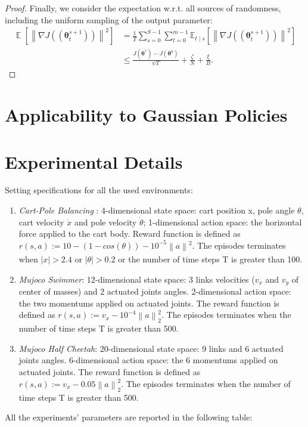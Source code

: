 \documentclass{article}
\makeatletter
\theoremstyle{remark}
\theoremstyle{definition}
\DeclareRobustCommand{\wrt}{w.r.t.\@\xspace}
\newcommand{\todomat}[1]{\todo[color=citrine, inline]{\small #1}}
\DeclareMathOperator*{\EV}{\mathbb{E}}
\newcommand{\EVV}[2][\ppvect \in \ppspace]{\EV_{#1}\left[{#2}\right]}
\newcommand{\norm}[2][\infty]{\left\|#2\right\|_{#1}}
\newcommand{\vtheta}{\boldsymbol{\theta}}
\newcommand{\gradJ}[1]{\nabla J(#1)}
\newcommand{\Ets}[2][t]{\mathbb{E}_{#1\mid s}\left[#2\right]}
\makeatother
\begin{document}
\begin{proof}
Finally, we consider the expectation \wrt all sources of randomness, including the uniform sampling of the output parameter:
\begin{align}
\EVV[]{\norm[]{\gradJ{(\vtheta_t^{s+1})}}^2} 
&=\frac{1}{T}\sum_{s=0}^{S-1}\sum_{t=0}^{m-1}\Ets{\norm[]{\gradJ{(\vtheta_t^{s+1})}}^2} \nonumber\\
&\leq
\frac{J(\vtheta^*) - J(\vtheta^0)}{\psi T} + \frac{\zeta}{N} + \frac{\xi}{B} \nonumber.
\end{align}
\end{proof}

\section{Applicability to Gaussian Policies}\label{app:pol}
\todomat{...}

\section{Experimental Details}\label{app:exp}
Setting specifications for all the used environments:
\begin{enumerate}
	\item \emph{Cart-Pole Balancing} : 4-dimensional state space: cart position x, pole angle $\theta$, cart velocity $\dot{x}$ and pole velocity $\dot{\theta}$; 1-dimensional action space: the horizontal force applied to the cart body. Reward function  is defined as $r(s, a) := 10 - (1 - cos(\theta)) - 10^{-5}\norm[] a^2$. The episodes terminates when $|x|>2.4$ or $|\theta|>0.2$ or the number of time steps T is greater than 100.
	\item \emph{Mujoco Swimmer}: 12-dimensional state space: 3 links velocities ($v_x$ and $v_y$ of center of masses) and 2 actuated joints angles. 2-dimensional action space: the two momentums applied on actuated joints.  The reward function is defined as $r(s, a) := v_x - 10^{-4}\norm[2] a^2$. The episodes terminates when the number of time steps T is greater than 500.
	\item \emph{Mujoco Half Cheetah}: 20-dimensional state space: 9 links and 6 actuated joints angles. 6-dimensional action space: the 6 momentums applied on actuated joints.  The reward function is defined as $r(s, a) := v_x - 0.05\norm[2] a^2$. The episodes terminates when the number of time steps T is greater than 500.
\end{enumerate}

All the experiments' parameters are reported in the following table:
\end{document}
